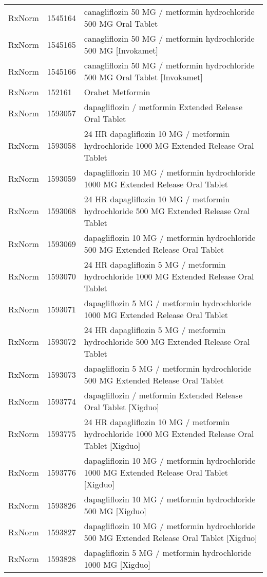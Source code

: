 \begin{longtable}{p{}p{}p{}}
  RxNorm & 1545164 & canagliflozin 50 MG / metformin hydrochloride 500 MG Oral Tablet \\ 
  RxNorm & 1545165 & canagliflozin 50 MG / metformin hydrochloride 500 MG [Invokamet] \\ 
  RxNorm & 1545166 & canagliflozin 50 MG / metformin hydrochloride 500 MG Oral Tablet [Invokamet] \\ 
  RxNorm & 152161 & Orabet Metformin \\ 
  RxNorm & 1593057 & dapagliflozin / metformin Extended Release Oral Tablet \\ 
  RxNorm & 1593058 & 24 HR dapagliflozin 10 MG / metformin hydrochloride 1000 MG Extended Release Oral Tablet \\ 
  RxNorm & 1593059 & dapagliflozin 10 MG / metformin hydrochloride 1000 MG Extended Release Oral Tablet \\ 
  RxNorm & 1593068 & 24 HR dapagliflozin 10 MG / metformin hydrochloride 500 MG Extended Release Oral Tablet \\ 
  RxNorm & 1593069 & dapagliflozin 10 MG / metformin hydrochloride 500 MG Extended Release Oral Tablet \\ 
  RxNorm & 1593070 & 24 HR dapagliflozin 5 MG / metformin hydrochloride 1000 MG Extended Release Oral Tablet \\ 
  RxNorm & 1593071 & dapagliflozin 5 MG / metformin hydrochloride 1000 MG Extended Release Oral Tablet \\ 
  RxNorm & 1593072 & 24 HR dapagliflozin 5 MG / metformin hydrochloride 500 MG Extended Release Oral Tablet \\ 
  RxNorm & 1593073 & dapagliflozin 5 MG / metformin hydrochloride 500 MG Extended Release Oral Tablet \\ 
  RxNorm & 1593774 & dapagliflozin / metformin Extended Release Oral Tablet [Xigduo] \\ 
  RxNorm & 1593775 & 24 HR dapagliflozin 10 MG / metformin hydrochloride 1000 MG Extended Release Oral Tablet [Xigduo] \\ 
  RxNorm & 1593776 & dapagliflozin 10 MG / metformin hydrochloride 1000 MG Extended Release Oral Tablet [Xigduo] \\ 
  RxNorm & 1593826 & dapagliflozin 10 MG / metformin hydrochloride 500 MG [Xigduo] \\ 
  RxNorm & 1593827 & dapagliflozin 10 MG / metformin hydrochloride 500 MG Extended Release Oral Tablet [Xigduo] \\ 
  RxNorm & 1593828 & dapagliflozin 5 MG / metformin hydrochloride 1000 MG [Xigduo] \\ 

\end{longtable}
